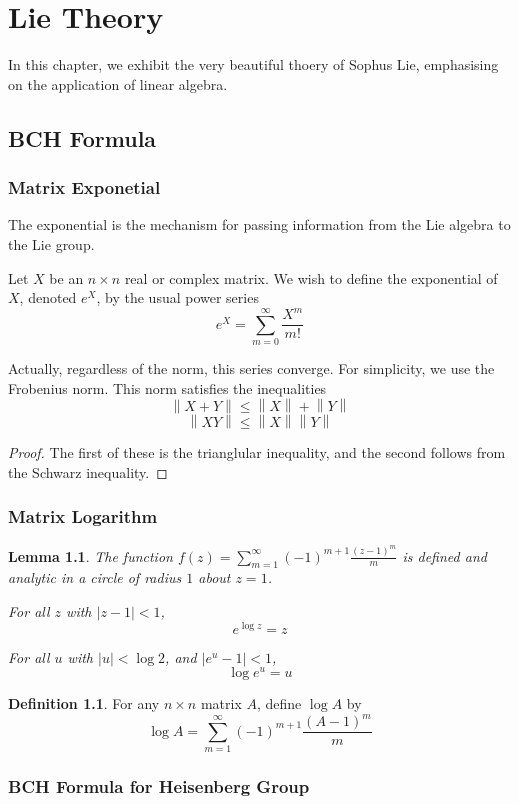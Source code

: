\documentclass{book}
\newtheorem{lemma}{Lemma}[section]
\theoremstyle{definition}
\newtheorem{definition}{Definition}[section]
\begin{document}
\chapter{Lie Theory}
In this chapter, we exhibit the very beautiful thoery of Sophus Lie, emphasising on the application of linear algebra.

\section{BCH Formula}
\subsection{Matrix Exponetial}
The exponential is the mechanism for passing information from the Lie algebra to the Lie group.

Let $X$ be an $n\times n$ real or complex matrix. We wish to define the exponential of $X$, denoted $e^X$, by the usual power series
\[e^X=\sum_{m=0}^\infty \frac{X^m}{m!}\] 

Actually, regardless of the norm, this series converge. For simplicity, we use the Frobenius norm. This norm satisfies the inequalities 
\[\left\|X+Y\right\|\le\left\|X\right\|+\left\|Y\right\|\]
\[\left\|XY\right\|\le \left\|X\right\|\left\|Y\right\|\] 
\begin{proof}
    The first of these is the trianglular inequality, and the second follows from the Schwarz inequality.
\end{proof}

\subsection{Matrix Logarithm}
\begin{lemma}
    The function $f(z)=\sum_{m=1}^\infty (-1)^{m+1}\frac{(z-1)^m}{m}$ is defined and analytic in a circle of radius $1$ about $z=1$.

    For all $z$ with $\left|z-1\right|<1$,\[e^{\log z}=z\] 

    For all $u$ with $\left|u\right|<\log 2$, and $\left|e^u-1\right|<1$, \[\log e^u=u\]
\end{lemma}
\begin{definition}
    For any $n\times n$ matrix $A$, define $\log A$ by \[\log A=\sum_{m=1}^\infty (-1)^{m+1}\frac{(A-1)^m}{m}\]
\end{definition}

\subsection{BCH Formula for Heisenberg Group}
\end{document}
